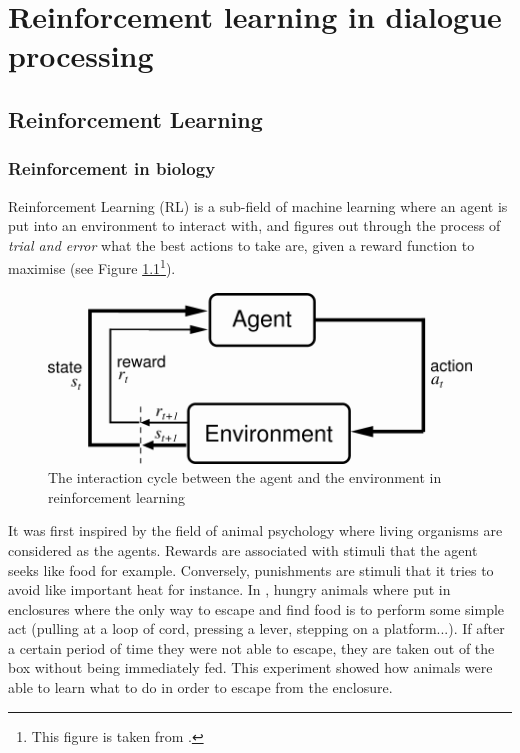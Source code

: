 \chapter{Reinforcement learning in dialogue processing}
\label{ch:soarl}

\section{Reinforcement Learning}
\label{soa:rl}

	\subsection{Reinforcement in biology}
    
		Reinforcement Learning (RL) is a sub-field of machine learning where an agent is put into an environment to interact with, and figures out through the process of \textit{trial and error} what the best actions to take are, given a reward function to maximise \cite{Sutton1998} (see Figure \ref{fig:rlscheme}\footnote{This figure is taken from \cite{Sutton1998}.}).
			
			\begin{figure}[ht]
				\centering
				\includegraphics[scale=0.7]{figures/rl.png}
				\caption{The interaction cycle between the agent and the environment in reinforcement learning}
				\label{fig:rlscheme}
			\end{figure}
			
			It was first inspired by the field of animal psychology where living organisms are considered as the agents. Rewards are associated with stimuli that the agent seeks like food for example. Conversely, punishments are stimuli that it tries to avoid like important heat for instance. In \cite{Thorndike1898}, hungry animals where put in enclosures where the only way to escape and find food is to perform some simple act (pulling at a loop of cord, pressing a lever, stepping on a platform...). If after a certain period of time they were not able to escape, they are taken out of the box without being immediately fed. This experiment showed how animals were able to learn what to do in order to escape from the enclosure.
			
